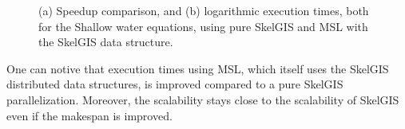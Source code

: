 \begin{figure}
\begin{center}
\hspace{10pt}
\end{center}
\caption{(a) Speedup comparison, and (b) logarithmic execution times, both for the Shallow water equations, using pure SkelGIS and MSL with the SkelGIS data structure.}
\label{fig:perfs}
\end{figure}

One can notive that execution times using MSL, which itself uses the SkelGIS distributed data structures, is improved compared to a pure SkelGIS parallelization. Moreover, the scalability stays close to the scalability of SkelGIS even if the makespan is improved.
